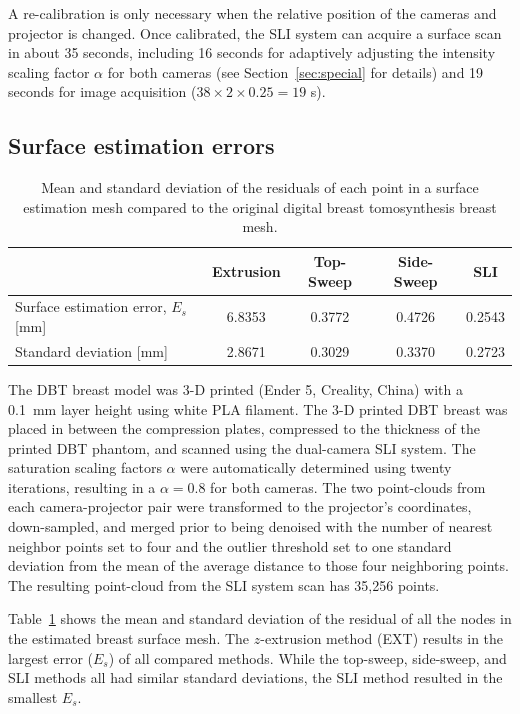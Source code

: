 A re-calibration is only necessary when the relative position of the cameras and projector is changed. Once calibrated, the \ac{SLI} system can acquire a surface scan in about 35 seconds, including 16 seconds for adaptively adjusting the intensity scaling factor $\alpha$ for both cameras (see Section~\ref{sec:special} for details) and 19 seconds for image acquisition ($38 \times 2\times 0.25 = 19$ s).

\subsection{Surface estimation errors}
\begin{table}
    \centering
    \caption{Mean and standard deviation of the residuals of each point in a surface estimation mesh compared to the original digital breast tomosynthesis breast mesh.}
        \begin{tabular}{lcccc}
        \toprule
         & Extrusion & Top-Sweep & Side-Sweep & \ac{SLI} \\ \midrule
        Surface estimation error, $E_s$ [mm] & 6.8353 & 0.3772 & 0.4726 & \multicolumn{1}{l}{0.2543} \\
        Standard deviation [mm] & 2.8671 & 0.3029 & 0.3370 & 0.2723 \\ \bottomrule
        \end{tabular}%
    \label{tab:residuals}
\end{table}

The \ac{DBT} breast model was 3-D printed (Ender 5, Creality, China) with a 0.1~mm layer height using white \ac{PLA} filament. The 3-D printed \ac{DBT} breast was placed in between the compression plates, compressed to the thickness of the printed \ac{DBT} phantom, and scanned using the dual-camera \ac{SLI} system. The saturation scaling factors $\alpha$ were automatically determined using twenty iterations, resulting in a $\alpha=0.8$ for both cameras. The two point-clouds from each camera-projector pair were transformed to the projector's coordinates, down-sampled, and merged prior to being denoised with the number of nearest neighbor points set to four and the outlier threshold set to one standard deviation from the mean of the average distance to those four neighboring points. The resulting point-cloud from the \ac{SLI} system scan has 35,256 points.

Table~\ref{tab:residuals} shows the mean and standard deviation of the residual of all the nodes in the estimated breast surface mesh. The $z$-extrusion method (EXT) results in the largest error ($E_s$) of all compared methods. While the top-sweep, side-sweep, and \ac{SLI} methods all had similar standard deviations, the \ac{SLI} method resulted in the smallest $E_s$.


